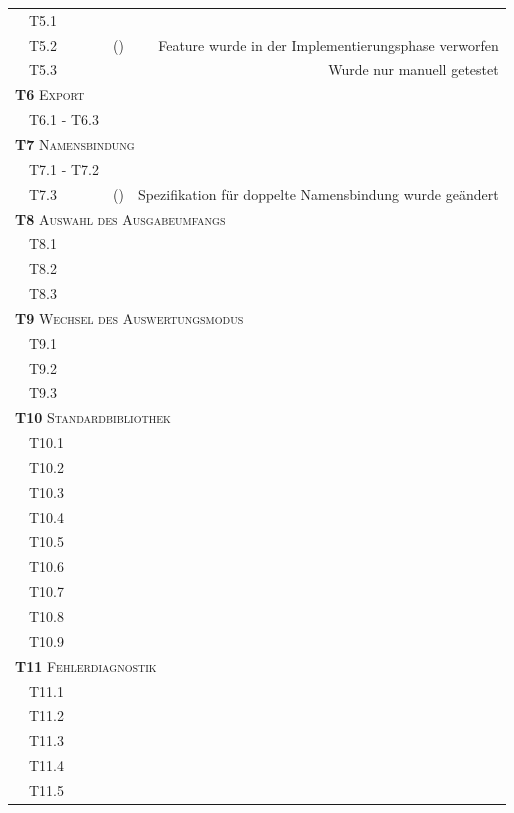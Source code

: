 \documentclass[parskip=full,11pt,openany]{scrreprt}
\newcommand{\cmark}{\ding{51}}%
\newcommand{\xmark}{\ding{55}}%
\begin{document}
\begin{table}[h]
\begin{tabular}{@{}llcr@{}}
		&T5.1 & \cmark & \\
		&T5.2 & (\xmark) & Feature wurde in der Implementierungsphase verworfen\\
		&T5.3 & \xmark & Wurde nur manuell getestet \\ %
		\multicolumn{4}{l}{\small \textsc{\textbf{T6} Export}}\\ 
		&T6.1 - T6.3 & \cmark & \\
		\multicolumn{4}{l}{\small \textsc{\textbf{T7} Namensbindung}}\\ 
		&T7.1 - T7.2 & \cmark & \\
		&T7.3 & (\cmark) & Spezifikation für doppelte Namensbindung wurde geändert \\ %
		\multicolumn{4}{l}{\small \textsc{\textbf{T8} Auswahl des Ausgabeumfangs}}\\ 
		&T8.1 & \xmark & \\
		&T8.2 & \xmark & \\
		&T8.3 & \xmark & \\
		\multicolumn{4}{l}{\small \textsc{\textbf{T9} Wechsel des Auswertungsmodus}}\\ 
		&T9.1 & \xmark & \\
		&T9.2 & \xmark & \\
		&T9.3 & \xmark & \\
		\multicolumn{4}{l}{\small \textsc{\textbf{T10} Standardbibliothek}}\\ 
		&T10.1 & \xmark & \\
		&T10.2 & \xmark & \\
		&T10.3 & \xmark & \\
		&T10.4 & \xmark & \\
		&T10.5 & \xmark & \\
		&T10.6 & \xmark & \\
		&T10.7 & \xmark & \\
		&T10.8 & \xmark & \\
		&T10.9 & \xmark & \\ 
		\multicolumn{4}{l}{\small \textsc{\textbf{T11} Fehlerdiagnostik}}\\ 
		&T11.1 & \xmark & \\
		&T11.2 & \xmark & \\
		&T11.3 & \xmark & \\
		&T11.4 & \xmark & \\
		&T11.5 & \xmark & \\
		\bottomrule
	\end{tabular}
\end{table}
\end{document}

